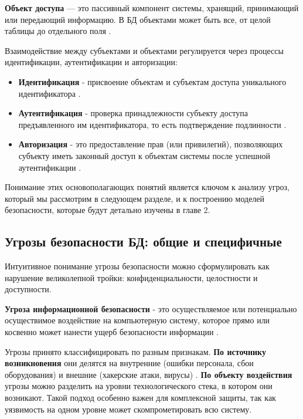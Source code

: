 \textbf{Объект доступа} — это пассивный компонент системы, хранящий, принимающий или передающий информацию. В БД объектами может быть все, от целой таблицы до отдельного поля \autocite[сс. 15-18]{Skakun}.

Взаимодействие между субъектами и объектами регулируется через процессы идентификации, аутентификации и авторизации:
\begin{itemize}
    \item \textbf{Идентификация} - присвоение объектам и субъектам доступа уникального идентификатора \autocite[сс. 15-18]{Skakun}.
    \item \textbf{Аутентификация}  - проверка принадлежности субъекту доступа предъявленного им идентификатора, то есть подтверждение подлинности \autocite[сс. 15-18]{Skakun}.
    \item \textbf{Авторизация} - это предоставление прав (или привилегий), позволяющих субъекту иметь законный доступ к объектам системы после успешной аутентификации \autocite[сс. 15-18]{Skakun}.
\end{itemize}

Понимание этих основополагающих понятий является ключом к анализу угроз, который мы рассмотрим в следующем разделе, и к построению моделей безопасности, которые будут детально изучены в главе 2.

\subsection{Угрозы безопасности БД: общие и специфичные}
Интуитивное понимание угрозы безопасности можно сформулировать как нарушение великолепной тройки: конфиденциальности, целостности и доступности. 
\begin{grayquote}
\textbf{Угроза информационной безопасности} - это осуществляемое или потенциально осуществимое воздействие на компьютерную систему, которое прямо или косвенно может нанести ущерб безопасности информации \autocite[с. 19]{Skakun}.
\end{grayquote}
Угрозы принято классифицировать по разным признакам. \textbf{По источнику возникновения} они делятся на внутренние (ошибки персонала, сбои оборудования) и внешние (хакерские атаки, вирусы) \autocite{Ytebov2008}. \textbf{По объекту воздействия} угрозы можно разделить на уровни технологического стека, в котором они возникают. Такой подход особенно важен для комплексной защиты, так как уязвимость на одном уровне может скомпрометировать всю систему.

